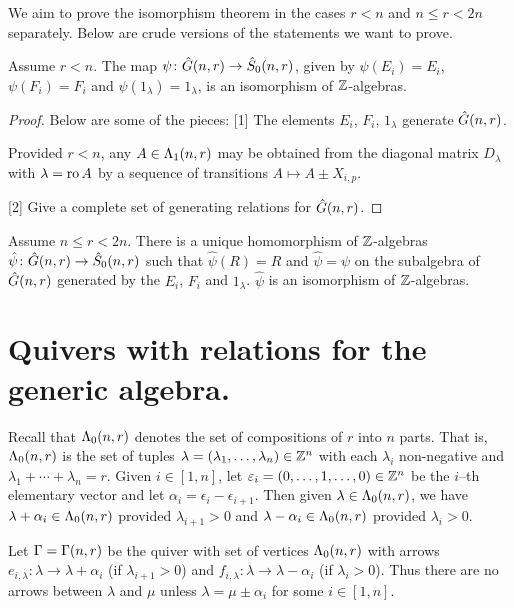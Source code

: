 \documentclass[a4paper, 11pt]{report}
\begin{document}
We aim to prove the isomorphism theorem in the cases $r<n$ and $n\le r< 2n$ separately. Below are crude versions of the statements we want to prove.

\begin{theorem}
Assume $r<n$. The map $\psi\colon\hat{G}(n,r)\to\hat{S}_0(n,r)$, given by $\psi(E_i)=E_i$, $\psi(F_i
)=F_i$ and $\psi(1_\lambda) = 1_\lambda$, is an isomorphism of $\mathbb{Z}$-algebras.
\end{theorem}
\begin{proof}{\color{gray}
Below are some of the pieces:
[1] The elements $E_i$, $F_i$, $1_\lambda$ generate $\hat{G}(n,r)$.

Provided $r<n$, any $A\in\Lambda_1(n,r)$ may be obtained from the diagonal matrix $D_\lambda$ with $\lambda=\operatorname{ro}{A}$ by a sequence of transitions $A \mapsto A\pm X_{i,p}$.

[2] Give a complete set of generating relations for $\hat{G}(n,r)$.}
\end{proof}

\begin{theorem}
Assume $n\le r< 2n$. There is a unique homomorphism of $\mathbb{Z}$-algebras $\hat{\psi}\colon\hat{G}(n,r)\to\hat{S}_0(n,r)$ such that $\hat{\psi}(R)=R$ and $\hat{\psi}=\psi$ on the subalgebra of $\hat{G}(n,r)$ generated by the $E_i$, $F_i$ and $1_\lambda$. $\hat{\psi}$ is an isomorphism of $\mathbb{Z}$-algebras.
\end{theorem}

\section{Quivers with relations for the generic algebra.}

Recall that $\Lambda_0(n,r)$ denotes the set of compositions of $r$ into $n$ parts. That is, $\Lambda_0(n,r)$ is the set of tuples $\lambda = (\lambda_1,\ldots,\lambda_n)\in\mathbb{Z}^n$ with each $\lambda_i$ non-negative and $\lambda_1 +\cdots +\lambda_n = r$. Given $i\in [1,n]$, let $\varepsilon_i = (0,\ldots,1,\ldots,0)\in\mathbb{Z}^n$ be the $i$--th elementary vector and let $\alpha_i = \epsilon_i - \epsilon_{i+1}$. Then given $\lambda\in\Lambda_0(n,r)$, we have $\lambda + \alpha_i\in\Lambda_0(n,r)$ provided $\lambda_{i+1}>0$ and $\lambda - \alpha_i\in\Lambda_0(n,r)$ provided $\lambda_i>0$.

Let $\Gamma =\Gamma(n,r)$ be the quiver with set of vertices $\Lambda_0(n,r)$ with arrows $e_{i,\lambda}\colon\lambda\to\lambda +\alpha_i$ (if $\lambda_{i+1}>0$) and $f_{i,\lambda}\colon\lambda\to\lambda -\alpha_i$ (if $\lambda_i>0$). Thus there are no arrows between $\lambda$ and $\mu$ unless $\lambda = \mu\pm \alpha_i$ for some $i\in [1,n]$.
\end{document}
